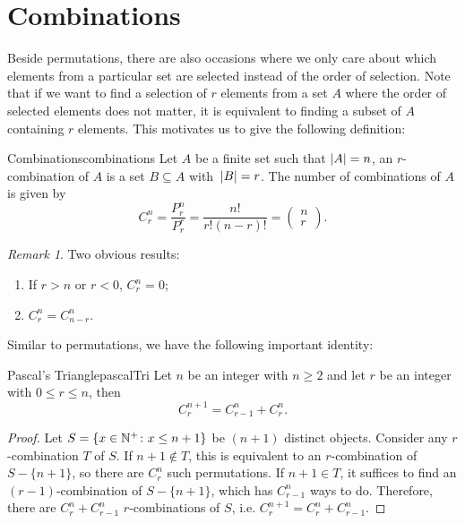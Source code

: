 \documentclass[math]{amznotes}
\theoremstyle{remark}
\newtheorem*{remark}{Remark}
\begin{document}
\section{Combinations}
Beside permutations, there are also occasions where we only care about which elements from a particular set are selected instead of the order of selection. Note that if we want to find a selection of $r$ elements from a set $A$ where the order of selected elements does not matter, it is equivalent to finding a subset of $A$ containing $r$ elements. This motivates us to give the following definition:
\begin{dfnbox}{Combinations}{combinations}
    Let $A$ be a finite set such that ${\left\lvert {A} \right\rvert} = n$, an $r$-combination of $A$ is a set $B \subseteq A$ with~${\left\lvert {B} \right\rvert} = r$. The number of combinations of $A$ is given by
    \begin{equation*}
        C^n_r = \frac{P^n_r}{P^r_r} = \frac{n!}{r!(n - r)!} = \begin{pmatrix}
            n \\
            r
        \end{pmatrix}.
    \end{equation*}
\end{dfnbox}
\begin{notebox}
    \begin{remark}
        Two obvious results:
        \begin{enumerate}
            \item If $r > n$ or $r < 0$, $C^n_r = 0$;
            \item $C^n_r = C^n_{n - r}$.
        \end{enumerate}
    \end{remark}
\end{notebox}
Similar to permutations, we have the following important identity:
\begin{thmbox}{Pascal's Triangle}{pascalTri}
    Let $n$ be an integer with $n \geq 2$ and let $r$ be an integer with $0 \leq r \leq n$, then
    \begin{equation*}
        C^{n + 1}_r = C^{n}_{r - 1} + C^{n}_r.
    \end{equation*}
    \tcblower
    \begin{proof}
        Let $S = \left\{x \in \mathbb{N}^+ \colon x \leq n + 1\right\}$ be $(n + 1)$ distinct objects. Consider any $r$-combination $T$ of $S$. If $n + 1 \notin T$, this is equivalent to an $r$-combination of~$S - \{n + 1\}$, so there are $C^n_r$ such permutations. If $n + 1 \in T$, it suffices to find an $(r - 1)$-combination of $S - \{n + 1\}$, which has $C^n_{r - 1}$ ways to do. Therefore, there are $C^n_{r} + C^n_{r - 1}$ $r$-combinations of $S$, i.e. $C^{n + 1}_r = C^n_r + C^n_{r - 1}$. 
    \end{proof}
\end{thmbox}
\end{document}
